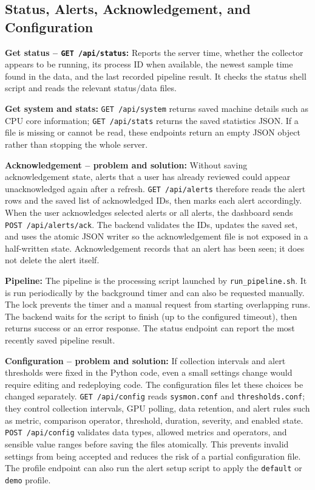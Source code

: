 \subsection{Status, Alerts, Acknowledgement, and Configuration}
\textbf{Get status -- \texttt{GET /api/status}:} Reports the server time, whether the collector appears to be running, its process ID when available, the newest sample time found in the data, and the last recorded pipeline result. It checks the status shell script and reads the relevant status/data files.

\textbf{Get system and stats:} \texttt{GET /api/system} returns saved machine details such as CPU core information; \texttt{GET /api/stats} returns the saved statistics JSON. If a file is missing or cannot be read, these endpoints return an empty JSON object rather than stopping the whole server.

\textbf{Acknowledgement -- problem and solution:} Without saving acknowledgement state, alerts that a user has already reviewed could appear unacknowledged again after a refresh. \texttt{GET /api/alerts} therefore reads the alert rows and the saved list of acknowledged IDs, then marks each alert accordingly. When the user acknowledges selected alerts or all alerts, the dashboard sends \texttt{POST /api/alerts/ack}. The backend validates the IDs, updates the saved set, and uses the atomic JSON writer so the acknowledgement file is not exposed in a half-written state. Acknowledgement records that an alert has been seen; it does not delete the alert itself.

\textbf{Pipeline:} The pipeline is the processing script launched by \texttt{run\_pipeline.sh}. It is run periodically by the background timer and can also be requested manually. The lock prevents the timer and a manual request from starting overlapping runs. The backend waits for the script to finish (up to the configured timeout), then returns success or an error response. The status endpoint can report the most recently saved pipeline result.

\textbf{Configuration -- problem and solution:} If collection intervals and alert thresholds were fixed in the Python code, even a small settings change would require editing and redeploying code. The configuration files let these choices be changed separately. \texttt{GET /api/config} reads \texttt{sysmon.conf} and \texttt{thresholds.conf}; they control collection intervals, GPU polling, data retention, and alert rules such as metric, comparison operator, threshold, duration, severity, and enabled state. \texttt{POST /api/config} validates data types, allowed metrics and operators, and sensible value ranges before saving the files atomically. This prevents invalid settings from being accepted and reduces the risk of a partial configuration file. The profile endpoint can also run the alert setup script to apply the \texttt{default} or \texttt{demo} profile.

